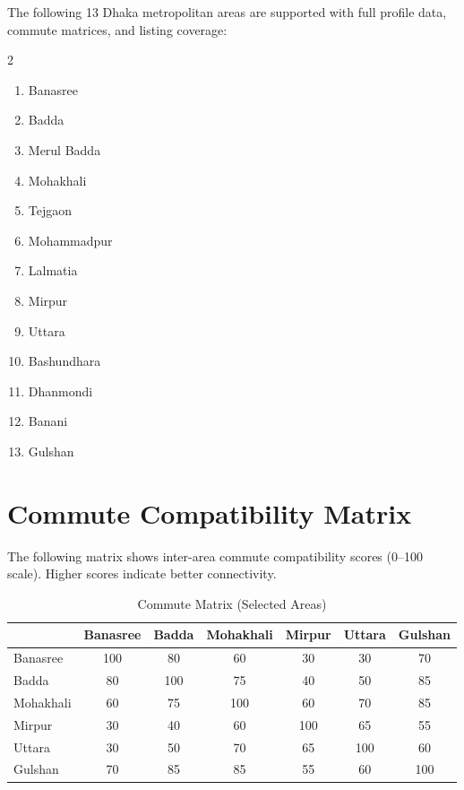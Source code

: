 \documentclass[12pt, a4paper, oneside]{report}
\begin{document}
The following 13 Dhaka metropolitan areas are supported with full profile data, commute matrices, and listing coverage:

\begin{multicols}{2}
\begin{enumerate}[leftmargin=2em]
  \item Banasree
  \item Badda
  \item Merul Badda
  \item Mohakhali
  \item Tejgaon
  \item Mohammadpur
  \item Lalmatia
  \item Mirpur
  \item Uttara
  \item Bashundhara
  \item Dhanmondi
  \item Banani
  \item Gulshan
\end{enumerate}
\end{multicols}

\chapter{Commute Compatibility Matrix}

The following matrix shows inter-area commute compatibility scores (0--100 scale). Higher scores indicate better connectivity.

\begin{table}[H]
\centering
\footnotesize
\caption{Commute Matrix (Selected Areas)}
\begin{tabular}{l|c c c c c c}
\toprule
& \textbf{Banasree} & \textbf{Badda} & \textbf{Mohakhali} & \textbf{Mirpur} & \textbf{Uttara} & \textbf{Gulshan} \\
\midrule
Banasree & 100 & 80 & 60 & 30 & 30 & 70 \\
Badda & 80 & 100 & 75 & 40 & 50 & 85 \\
Mohakhali & 60 & 75 & 100 & 60 & 70 & 85 \\
Mirpur & 30 & 40 & 60 & 100 & 65 & 55 \\
Uttara & 30 & 50 & 70 & 65 & 100 & 60 \\
Gulshan & 70 & 85 & 85 & 55 & 60 & 100 \\
\bottomrule
\end{tabular}
\end{table}
\end{document}
